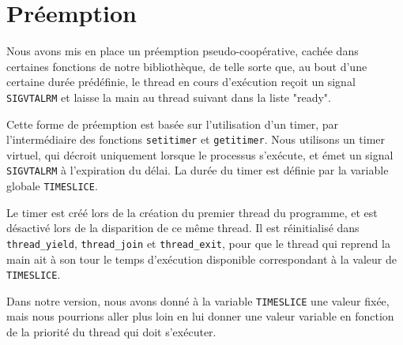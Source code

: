 \section{Préemption}
Nous avons mis en place un préemption pseudo-coopérative, cachée dans
certaines fonctions de notre bibliothèque, de telle sorte que, au bout
d'une certaine durée prédéfinie, le thread en cours d'exécution reçoit
un signal \verb$SIGVTALRM$ et laisse la main au thread suivant dans la
liste "ready".

Cette forme de préemption est basée sur l'utilisation d'un timer, par
l'intermédiaire des fonctions \verb$setitimer$ et
\verb$getitimer$. Nous utilisons un timer virtuel, qui décroit
uniquement lorsque le processus s'exécute, et émet un signal
\verb$SIGVTALRM$ à l'expiration du délai.  La durée du timer est
définie par la variable globale \verb$TIMESLICE$.

Le timer est créé lors de la création du premier thread du programme,
et est désactivé lors de la disparition de ce même thread. Il est
réinitialisé dans \verb$thread_yield$, \verb$thread_join$ et
\verb$thread_exit$, pour que le thread qui reprend la main ait à son
tour le temps d'exécution disponible correspondant à la valeur de
\verb$TIMESLICE$. 

Dans notre version, nous avons donné à la variable \verb$TIMESLICE$
une valeur fixée, mais nous pourrions aller plus loin en lui donner
une valeur variable en fonction de la priorité du thread qui doit
s'exécuter.
